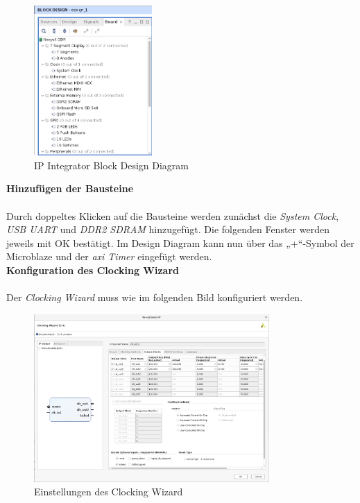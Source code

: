\begin{figure}[H]
\centering
\includegraphics[width=0.4\textwidth]{Hauptteil/schritt3.png}
\caption{IP Integrator Block Design Diagram}\label{fig:mbschritt3}
\end{figure}

\vspace{10mm}


\textbf{Hinzufügen der Bausteine}\\\\
Durch doppeltes Klicken auf die Bausteine werden zunächst die \emph{System Clock}, \emph{USB UART} und \emph{DDR2 SDRAM} hinzugefügt. Die folgenden Fenster werden jeweils mit OK bestätigt.
Im Design Diagram kann nun über das „+“-Symbol der Microblaze und der \emph{\ac{axi} Timer} eingefügt werden.\\

\newpage
\textbf{Konfiguration des Clocking Wizard}\\\\
Der \emph{Clocking Wizard} muss wie im folgenden Bild konfiguriert werden.\\

\vspace{10mm}

\begin{figure}[H]
\centering
\includegraphics[width=0.8\textwidth]{Hauptteil/Schritt5.png}
\caption{Einstellungen des Clocking Wizard}\label{fig:mbschritt5}
\end{figure}


